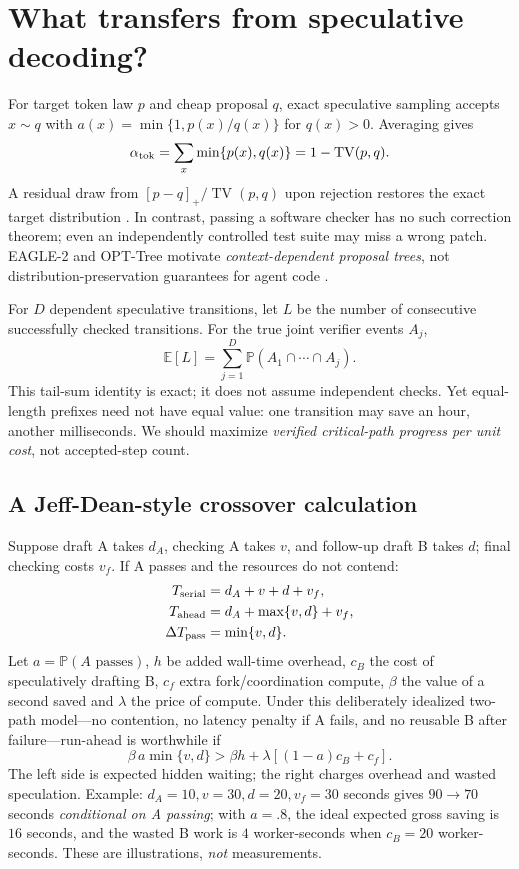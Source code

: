 \documentclass[10pt,twocolumn]{article}
\newcommand{\Pp}{\mathbb P}
\newcommand{\Ee}{\mathbb E}
\newcommand{\TV}{\operatorname{TV}}
\begin{document}
\section{What transfers from speculative decoding?}

For target token law $p$ and cheap proposal $q$, exact speculative sampling accepts $x\sim q$ with $a(x)=\min\{1,p(x)/q(x)\}$ for $q(x)>0$. Averaging gives
\begin{equation}\label{eq:tv}
\alpha_{\rm tok}=\sum_x \min\{p(x),q(x)\}=1-\TV(p,q).
\end{equation}
A residual draw from $[p-q]_+/\TV(p,q)$ upon rejection restores the exact target distribution \cite{leviathan}. In contrast, passing a software checker has no such correction theorem; even an independently controlled test suite may miss a wrong patch. EAGLE-2 and OPT-Tree motivate \emph{context-dependent proposal trees}, not distribution-preservation guarantees for agent code \cite{eagle2,opttree}.

For $D$ dependent speculative transitions, let $L$ be the number of consecutive successfully checked transitions. For the true joint verifier events $A_j$,
\begin{equation}\label{eq:prefix}
\Ee[L]=\sum_{j=1}^{D}\Pp(A_1\cap\cdots\cap A_j).
\end{equation}
This tail-sum identity is exact; it does not assume independent checks. Yet equal-length prefixes need not have equal value: one transition may save an hour, another milliseconds. We should maximize \emph{verified critical-path progress per unit cost}, not accepted-step count.

\subsection{A Jeff-Dean-style crossover calculation}
Suppose draft A takes $d_A$, checking A takes $v$, and follow-up draft B takes $d$; final checking costs $v_f$. If A passes and the resources do not contend:
\begin{align}
T_{\rm serial}&=d_A+v+d+v_f,\\
T_{\rm ahead}&=d_A+\max\{v,d\}+v_f,\\
\Delta T_{\rm pass}&=\min\{v,d\}.\label{eq:overlap}
\end{align}
Let $a=\Pp(A\text{ passes})$, $h$ be added wall-time overhead, $c_B$ the cost of speculatively drafting B, $c_f$ extra fork/coordination compute, $\beta$ the value of a second saved and $\lambda$ the price of compute. Under this deliberately idealized two-path model---no contention, no latency penalty if A fails, and no reusable B after failure---run-ahead is worthwhile if
\begin{equation}\label{eq:threshold}
\boxed{\beta\,a\min\{v,d\}>\beta h+\lambda[(1-a)c_B+c_f].}
\end{equation}
The left side is expected hidden waiting; the right charges overhead and wasted speculation. Example: $d_A=10,v=30,d=20,v_f=30$ seconds gives $90\to70$ seconds \emph{conditional on A passing}; with $a=.8$, the ideal expected gross saving is $16$ seconds, and the wasted B work is $4$ worker-seconds when $c_B=20$ worker-seconds. These are illustrations, \emph{not} measurements.
\end{document}
